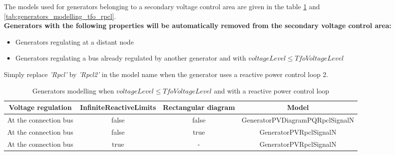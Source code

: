 \documentclass[a4paper, 12pt]{report}
\begin{document}
\label{DFL_SVC_Rpcl_Generators}

The models used for generators belonging to a secondary voltage control area are given in the table \ref{tab:generators_modelling_rpcl} and \ref{tab:generators_modelling_tfo_rpcl}.\\

\textbf{Generators with the following properties will be automatically removed from the secondary voltage control area:}
\begin{itemize}
  \item Generators regulating at a distant node
  \item Generators regulating a bus already regulated by another generator and with $voltageLevel \leq TfoVoltageLevel$
\end{itemize}


Simply replace \textit{'Rpcl'} by \textit{'Rpcl2'} in the model name when the generator uses a reactive power control loop 2.\\

\begin{table}[h!]
\center
\begin{tabular}{ c | c | c | c}
\toprule
\scriptsize{\textbf{{Voltage regulation}}} & \scriptsize{\textbf{{InfiniteReactiveLimits}}} & \scriptsize{\textbf{{Rectangular diagram}}}  & \scriptsize{\textbf{{Model}}}\\
\midrule
\rowcolor{white}
 \scriptsize{At the connection bus} & \scriptsize{false} & \scriptsize{false} & \scriptsize{GeneratorPVDiagramPQRpclSignalN} \\
\rowcolor{gray!10}
 \scriptsize{At the connection bus} & \scriptsize{false} & \scriptsize{true} & \scriptsize{GeneratorPVRpclSignalN} \\
\rowcolor{white}
 \scriptsize{At the connection bus} & \scriptsize{true} & \scriptsize{-} & \scriptsize{GeneratorPVRpclSignalN} \\
\bottomrule
\end{tabular}
\caption{Generators modelling when $voltageLevel \leq TfoVoltageLevel$ and with a reactive power control loop}
\label{tab:generators_modelling_rpcl}
\end{table}
\end{document}
